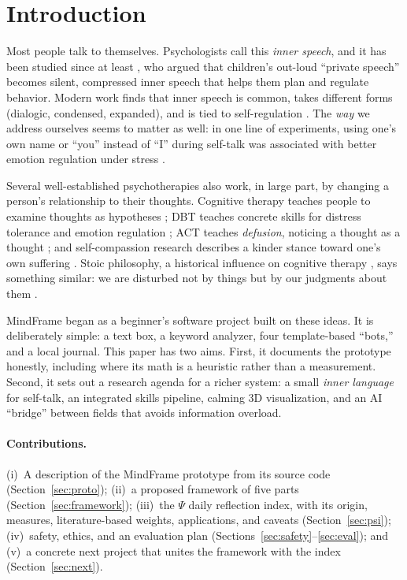\documentclass[11pt]{article}
\begin{document}
\section{Introduction}
Most people talk to themselves. Psychologists call this \emph{inner speech}, and it has been studied since at least \citet{vygotsky1986}, who argued that children's out-loud ``private speech'' becomes silent, compressed inner speech that helps them plan and regulate behavior. Modern work finds that inner speech is common, takes different forms (dialogic, condensed, expanded), and is tied to self-regulation \citep{aldersonday2015,fernyhough2016}. The \emph{way} we address ourselves seems to matter as well: in one line of experiments, using one's own name or ``you'' instead of ``I'' during self-talk was associated with better emotion regulation under stress \citep{kross2014}.

Several well-established psychotherapies also work, in large part, by changing a person's relationship to their thoughts. Cognitive therapy teaches people to examine thoughts as hypotheses \citep{beck1979}; DBT teaches concrete skills for distress tolerance and emotion regulation \citep{linehan2015}; ACT teaches \emph{defusion}, noticing a thought as a thought \citep{hayes2012}; and self-compassion research describes a kinder stance toward one's own suffering \citep{neff2003}. Stoic philosophy, a historical influence on cognitive therapy \citep{robertson2010}, says something similar: we are disturbed not by things but by our judgments about them \citep{epictetus}.

MindFrame began as a beginner's software project built on these ideas. It is deliberately simple: a text box, a keyword analyzer, four template-based ``bots,'' and a local journal. This paper has two aims. First, it documents the prototype honestly, including where its math is a heuristic rather than a measurement. Second, it sets out a research agenda for a richer system: a small \emph{inner language} for self-talk, an integrated skills pipeline, calming 3D visualization, and an AI ``bridge'' between fields that avoids information overload.

\paragraph{Contributions.} (i)~A description of the MindFrame prototype from its source code (Section~\ref{sec:proto}); (ii)~a proposed framework of five parts (Section~\ref{sec:framework}); (iii)~the $\Psi$ daily reflection index, with its origin, measures, literature-based weights, applications, and caveats (Section~\ref{sec:psi}); (iv)~safety, ethics, and an evaluation plan (Sections~\ref{sec:safety}--\ref{sec:eval}); and (v)~a concrete next project that unites the framework with the index (Section~\ref{sec:next}).
\end{document}
